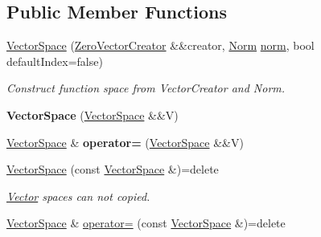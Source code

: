 \subsection*{Public Member Functions}
\begin{DoxyCompactItemize}
\item 
\hyperlink{classSpacy_1_1VectorSpace_aa4f30986a1b977cf7f0abc27e0c9872d}{Vector\+Space} (\hyperlink{classSpacy_1_1ZeroVectorCreator}{Zero\+Vector\+Creator} \&\&creator, \hyperlink{namespaceSpacy_a0dbe77a4e1282ef88017e94d50d17791}{Norm} \hyperlink{classSpacy_1_1VectorSpace_a2f26e33994544a37a83e6938a748ab8c}{norm}, bool default\+Index=false)
\begin{DoxyCompactList}\small\item\em Construct function space from Vector\+Creator and Norm. \end{DoxyCompactList}\item 
{\bfseries Vector\+Space} (\hyperlink{classSpacy_1_1VectorSpace}{Vector\+Space} \&\&V)\hypertarget{classSpacy_1_1VectorSpace_a2bc6444dc35de9fe68d7a8156c03125f}{}\label{classSpacy_1_1VectorSpace_a2bc6444dc35de9fe68d7a8156c03125f}

\item 
\hyperlink{classSpacy_1_1VectorSpace}{Vector\+Space} \& {\bfseries operator=} (\hyperlink{classSpacy_1_1VectorSpace}{Vector\+Space} \&\&V)\hypertarget{classSpacy_1_1VectorSpace_a5c43f6cca9f16ee3839e813633f87370}{}\label{classSpacy_1_1VectorSpace_a5c43f6cca9f16ee3839e813633f87370}

\item 
\hyperlink{classSpacy_1_1VectorSpace_ae8f3f22a43fcc418c447b5f49568d54e}{Vector\+Space} (const \hyperlink{classSpacy_1_1VectorSpace}{Vector\+Space} \&)=delete\hypertarget{classSpacy_1_1VectorSpace_ae8f3f22a43fcc418c447b5f49568d54e}{}\label{classSpacy_1_1VectorSpace_ae8f3f22a43fcc418c447b5f49568d54e}

\begin{DoxyCompactList}\small\item\em \hyperlink{classSpacy_1_1Vector}{Vector} spaces can not copied. \end{DoxyCompactList}\item 
\hyperlink{classSpacy_1_1VectorSpace}{Vector\+Space} \& \hyperlink{classSpacy_1_1VectorSpace_a30d39a339ed924a6c17c85d75f64afc4}{operator=} (const \hyperlink{classSpacy_1_1VectorSpace}{Vector\+Space} \&)=delete\hypertarget{classSpacy_1_1VectorSpace_a30d39a339ed924a6c17c85d75f64afc4}{}\label{classSpacy_1_1VectorSpace_a30d39a339ed924a6c17c85d75f64afc4}


\end{DoxyCompactItemize}
